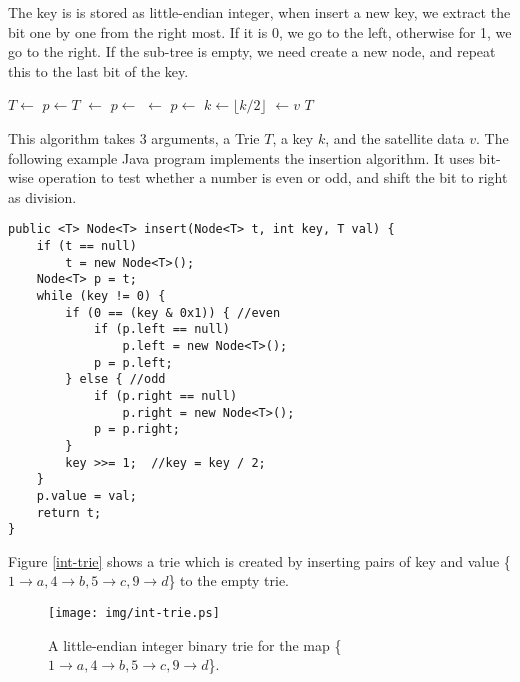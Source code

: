 \documentclass{article}
\begin{document}
The key is is stored as little-endian integer, when insert a new key,
we extract the bit one by one from the right most.
If it is 0, we go to the left, otherwise for 1, we go to the right.
If the sub-tree is empty, we need create a new node, and repeat this to
the last bit of the key.

\begin{algorithmic}[1]
    \State $T \gets$ 
  \EndIf
  \State $p \gets T$
        \State {} $\gets$ 
      \EndIf
      \State $p \gets$ 
    \Else
        \State {} $\gets$ 
      \EndIf
      \State $p \gets$ 
    \EndIf
    \State $k \gets \lfloor k/2 \rfloor$
  \EndWhile
  \State {} $\gets v$
  \State \Return $T$
\EndFunction
\end{algorithmic}

This algorithm takes 3 arguments, a Trie $T$, a key $k$, and the satellite
data $v$. The following example Java program implements the insertion algorithm.
It uses bit-wise operation to test whether a number is even or odd, and shift
the bit to right as division.

\lstset{language=Java}
\begin{lstlisting}
public <T> Node<T> insert(Node<T> t, int key, T val) {
    if (t == null)
        t = new Node<T>();
    Node<T> p = t;
    while (key != 0) {
        if (0 == (key & 0x1)) { //even
            if (p.left == null)
                p.left = new Node<T>();
            p = p.left;
        } else { //odd
            if (p.right == null)
                p.right = new Node<T>();
            p = p.right;
        }
        key >>= 1;  //key = key / 2;
    }
    p.value = val;
    return t;
}
\end{lstlisting}

Figure \ref{int-trie} shows a trie which is created by inserting
pairs of key and value
\{$ 1 \rightarrow a, 4 \rightarrow b, 5 \rightarrow c, 9 \rightarrow d$\}
to the empty trie.

\begin{figure}[htbp]
  \centering
  \texttt{[image: img/int-trie.ps]}
  \caption{A little-endian integer binary trie for the map
          \{$ 1 \rightarrow a, 4 \rightarrow b, 5 \rightarrow c, 9 \rightarrow d$\}.}
  \label{fig:int-trie}
\end{figure}
\end{document}
